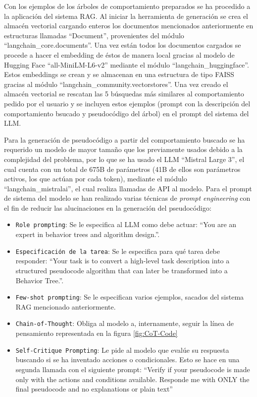 Con los ejemplos de los árboles de comportamiento preparados se ha procedido a la aplicación del sistema RAG.
Al iniciar la herramienta de generación se crea el almacén vectorial cargando enteros los documentos mencionados anteriormente en estructuras llamadas ``Document'', provenientes del módulo ``langchain\_core.documents''.
Una vez están todos los documentos cargados se procede a hacer el embedding de éstos de manera local gracias al modelo de Hugging Face ``all-MiniLM-L6-v2'' mediante el módulo ``langchain\_huggingface''.
Estos embeddings se crean y se almacenan en una estructura de tipo FAISS gracias al módulo ``langchain\_community.vectorstores''.
Una vez creado el almacén vectorial se rescatan las 5 búsquedas más similares al comportamiento pedido por el usuario y se incluyen estos ejemplos (prompt con la descripción del comportamiento bsucado y pseudocódigo del árbol) en el prompt del sistema del LLM.

Para la generación de pseudocódigo a partir del comportamiento buscado se ha requerido un modelo de mayor tamaño que los previamente usados debido a la complejidad del problema, por lo que se ha usado el LLM ``Mistral Large 3'', el cual cuenta con un total de 675B de parámetros (41B de ellos son parámetros activos, los que actúan por cada token), mediante el módulo ``langchain\_mistralai'', el cual realiza llamadas de API al modelo.
Para el prompt de sistema del modelo se han realizado varias técnicas de \textit{prompt engineering} con el fin de reducir las alucinaciones en la generación del pseudocódigo:

\begin{itemize}
    \item \texttt{Role prompting}: Se le especifica al LLM como debe actuar: ``You are an expert in behavior trees and algorithm design.''.
    \item \texttt{Especificación de la tarea}: Se le especifica para qué tarea debe responder: ``Your task is to convert a high-level task description into a structured pseudocode algorithm that can later be transformed into a Behavior Tree.''.
    \item \texttt{Few-shot prompting}: Se le especifican varios ejemplos, sacados del sistema RAG mencionado anteriormente.
    \item \texttt{Chain-of-Thought}: Obliga al modelo a, internamente, seguir la línea de pensamiento representada en la figura \ref{fig:CoT-Code}
    \item \texttt{Self‑Critique Prompting}: Le pide al modelo que evalúe su respuesta buscando si se ha inventado acciones o condicionales. Esto se hace en una segunda llamada con el siguiente prompt: ``Verify if your pseudocode is made only with the actions and conditions available. Responde me with ONLY the final pseudocode and no explanations or plain text''
\end{itemize}

